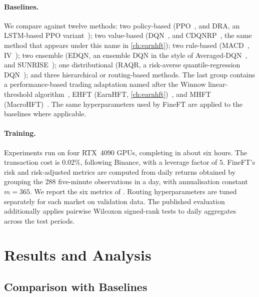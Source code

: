 \paragraph{Baselines.} We compare against twelve methods: two policy-based (PPO~\cite{schulman2017proximal}, and DRA, an LSTM-based PPO variant~\cite{briola2021deep}); two value-based (DQN~\cite{mnih2015human}, and CDQNRP~\cite{zhu2022quantitative}, the same method that appears under this name in \cref{ch:earnhft}); two rule-based (MACD~\cite{appel2005technical}, IV~\cite{chordia2002order}); two ensemble (EDQN, an ensemble DQN in the style of Averaged-DQN~\cite{anschel2017averaged}, and SUNRISE~\cite{lee2021sunrise}); one distributional (RAQR, a risk-averse quantile-regression DQN~\cite{dabney2018distributional}); and three hierarchical or routing-based methods. The last group contains a performance-based trading adaptation named after the Winnow linear-threshold algorithm~\cite{littlestone1988winnow}, EHFT (EarnHFT, \cref{ch:earnhft})~\cite{qin2024earnhft}, and MHFT (MacroHFT)~\cite{zong2024macrohft}. The same hyperparameters used by FineFT are applied to the baselines where applicable.

\paragraph{Training.} Experiments run on four RTX~4090 GPUs, completing in about six hours. The transaction cost is $0.02\%$, following Binance, with a leverage factor of $5$. FineFT's risk and risk-adjusted metrics are computed from daily returns obtained by grouping the 288 five-minute observations in a day, with annualisation constant $m=365$. We report the six metrics of . Routing hyperparameters are tuned separately for each market on validation data. The published evaluation additionally applies pairwise Wilcoxon signed-rank tests to daily aggregates across the test periods.

\section{Results and Analysis}
\label{sec:fineft_results}

\subsection{Comparison with Baselines}
\label{sec:fineft_comparison}

